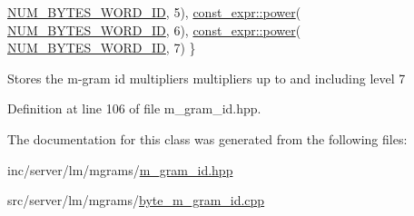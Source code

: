\begin{DoxyCode}
      \hyperlink{classuva_1_1smt_1_1bpbd_1_1server_1_1lm_1_1m__grams_1_1m__gram__id_1_1_byte___m___gram___id_abfb2441a9e2b433ef183d2f979979122}{NUM\_BYTES\_WORD\_ID}, 5),
                                    \hyperlink{namespaceuva_1_1utils_1_1math_1_1const__expr_af88edac03f2feda3027da86d576d5b46}{const\_expr::power}(
      \hyperlink{classuva_1_1smt_1_1bpbd_1_1server_1_1lm_1_1m__grams_1_1m__gram__id_1_1_byte___m___gram___id_abfb2441a9e2b433ef183d2f979979122}{NUM\_BYTES\_WORD\_ID}, 6),
                                    \hyperlink{namespaceuva_1_1utils_1_1math_1_1const__expr_af88edac03f2feda3027da86d576d5b46}{const\_expr::power}(
      \hyperlink{classuva_1_1smt_1_1bpbd_1_1server_1_1lm_1_1m__grams_1_1m__gram__id_1_1_byte___m___gram___id_abfb2441a9e2b433ef183d2f979979122}{NUM\_BYTES\_WORD\_ID}, 7)
                                \}
\end{DoxyCode}
Stores the m-\/gram id multipliers multipliers up to and including level 7 

Definition at line 106 of file m\+\_\+gram\+\_\+id.\+hpp.



The documentation for this class was generated from the following files\+:\begin{DoxyCompactItemize}
\item 
inc/server/lm/mgrams/\hyperlink{m__gram__id_8hpp}{m\+\_\+gram\+\_\+id.\+hpp}\item 
src/server/lm/mgrams/\hyperlink{byte__m__gram__id_8cpp}{byte\+\_\+m\+\_\+gram\+\_\+id.\+cpp}\end{DoxyCompactItemize}
